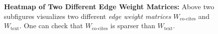 \begin{figure}[ht]
    \begin{subfigure}[b]{0.49\textwidth}
    \end{subfigure}
    \hfill
    \begin{subfigure}[b]{0.49\textwidth}
    \end{subfigure}
    \label{fig:sparse_dense}
    \vfill
    \centering{
        
    }
    \caption{\textbf{Heatmap of Two Different Edge Weight Matrices: }Above two subfigures visualizes two different \textit{edge weight matrices} $W_{\text{co-cites}}$ and $W_{\text{text}}$. One can check that $W_{\text{co-cites}}$ is sparser than $W_{\text{text}}$.}
    \label{fig:heatmap:edgeweights:compare}
\end{figure}

